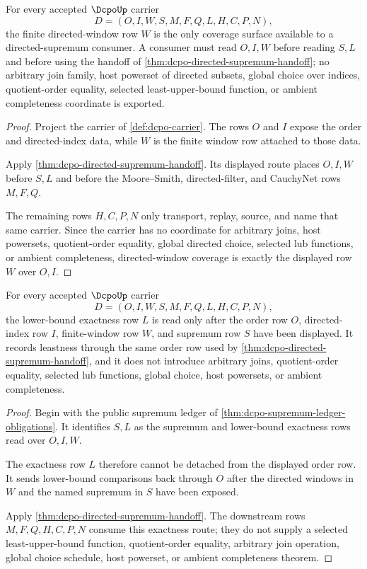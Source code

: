 \begin{theorem}
\label{thm:dcpo-directed-window-coverage}
For every accepted $\DcpoUp$ carrier
$$
D=(O,I,W,S,M,F,Q,L,H,C,P,N),
$$
the finite directed-window row $W$ is the only coverage surface available to a directed-supremum consumer. A consumer must read $O,I,W$ before reading $S,L$ and before using the handoff of \autoref{thm:dcpo-directed-supremum-handoff}; no arbitrary join family, host powerset of directed subsets, global choice over indices, quotient-order equality, selected least-upper-bound function, or ambient completeness coordinate is exported.
\end{theorem}
\begin{proof}
Project the carrier of \autoref{def:dcpo-carrier}. The rows $O$ and $I$ expose the order and directed-index data, while $W$ is the finite window row attached to those data.

Apply \autoref{thm:dcpo-directed-supremum-handoff}. Its displayed route places $O,I,W$ before $S,L$ and before the Moore--Smith, directed-filter, and CauchyNet rows $M,F,Q$.

The remaining rows $H,C,P,N$ only transport, replay, source, and name that same carrier. Since the carrier has no coordinate for arbitrary joins, host powersets, quotient-order equality, global directed choice, selected lub functions, or ambient completeness, directed-window coverage is exactly the displayed row $W$ over $O,I$.
\end{proof}

\begin{theorem}
\label{thm:dcpo-lower-bound-exactness}
For every accepted $\DcpoUp$ carrier
$$
D=(O,I,W,S,M,F,Q,L,H,C,P,N),
$$
the lower-bound exactness row $L$ is read only after the order row $O$, directed-index row $I$, finite-window row $W$, and supremum row $S$ have been displayed. It records leastness through the same order row used by \autoref{thm:dcpo-directed-supremum-handoff}, and it does not introduce arbitrary joins, quotient-order equality, selected lub functions, global choice, host powersets, or ambient completeness.
\end{theorem}
\begin{proof}
Begin with the public supremum ledger of \autoref{thm:dcpo-supremum-ledger-obligations}. It identifies $S,L$ as the supremum and lower-bound exactness rows read over $O,I,W$.

The exactness row $L$ therefore cannot be detached from the displayed order row. It sends lower-bound comparisons back through $O$ after the directed windows in $W$ and the named supremum in $S$ have been exposed.

Apply \autoref{thm:dcpo-directed-supremum-handoff}. The downstream rows $M,F,Q,H,C,P,N$ consume this exactness route; they do not supply a selected least-upper-bound function, quotient-order equality, arbitrary join operation, global choice schedule, host powerset, or ambient completeness theorem.
\end{proof}

